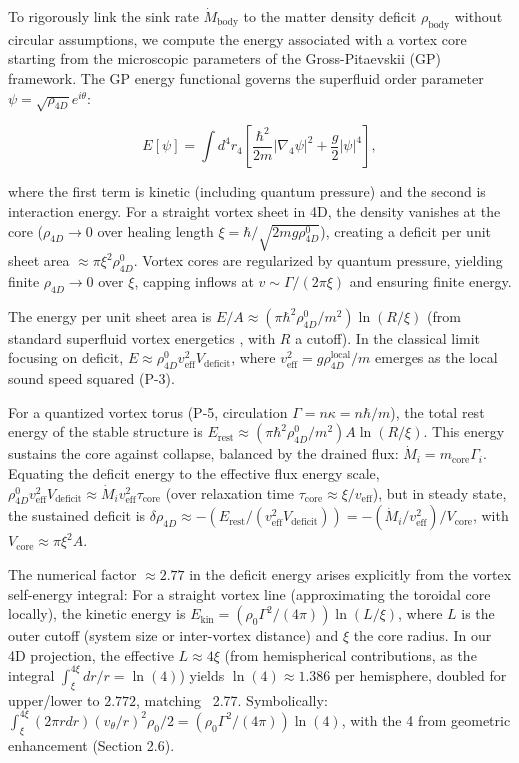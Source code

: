 \documentclass{article}
\begin{document}
To rigorously link the sink rate $\dot{M}_{\text{body}}$ to the matter density deficit $\rho_{\text{body}}$ without circular assumptions, we compute the energy associated with a vortex core starting from the microscopic parameters of the Gross-Pitaevskii (GP) framework. The GP energy functional governs the superfluid order parameter $\psi = \sqrt{\rho_{4D}} e^{i \theta}$:

\[
E[\psi] = \int d^4 r_4 \left[ \frac{\hbar^2}{2 m} |\nabla_4 \psi|^2 + \frac{g}{2} |\psi|^4 \right],
\]

where the first term is kinetic (including quantum pressure) and the second is interaction energy. For a straight vortex sheet in 4D, the density vanishes at the core ($\rho_{4D} \to 0$ over healing length $\xi = \hbar / \sqrt{2 m g \rho_{4D}^0}$), creating a deficit per unit sheet area $\approx \pi \xi^2 \rho_{4D}^0$. Vortex cores are regularized by quantum pressure, yielding finite $\rho_{4D} \to 0$ over $\xi$, capping inflows at $v \sim \Gamma / (2\pi \xi)$ and ensuring finite energy.

The energy per unit sheet area is $E / A \approx (\pi \hbar^2 \rho_{4D}^0 / m^2) \ln(R / \xi)$ (from standard superfluid vortex energetics \cite{onsager1949, feynman1955}, with $R$ a cutoff). In the classical limit focusing on deficit, $E \approx \rho_{4D}^0 v_{\text{eff}}^2 V_{\text{deficit}}$, where $v_{\text{eff}}^2 = g \rho_{4D}^{\text{local}} / m$ emerges as the local sound speed squared (P-3).

For a quantized vortex torus (P-5, circulation $\Gamma = n \kappa = n \hbar / m$), the total rest energy of the stable structure is $E_{\text{rest}} \approx (\pi \hbar^2 \rho_{4D}^0 / m^2) A \ln(R / \xi)$. This energy sustains the core against collapse, balanced by the drained flux: $\dot{M}_i = m_{\text{core}} \Gamma_i$. Equating the deficit energy to the effective flux energy scale, $\rho_{4D}^0 v_{\text{eff}}^2 V_{\text{deficit}} \approx \dot{M}_i v_{\text{eff}}^2 \tau_{\text{core}}$ (over relaxation time $\tau_{\text{core}} \approx \xi / v_{\text{eff}}$), but in steady state, the sustained deficit is $\delta \rho_{4D} \approx - (E_{\text{rest}} / (v_{\text{eff}}^2 V_{\text{deficit}})) = - (\dot{M}_i / v_{\text{eff}}^2) / V_{\text{core}}$, with $V_{\text{core}} \approx \pi \xi^2 A$.

The numerical factor \(\approx 2.77\) in the deficit energy arises explicitly from the vortex self-energy integral: For a straight vortex line (approximating the toroidal core locally), the kinetic energy is \(E_{\text{kin}} = (\rho_0 \Gamma^2 / (4\pi)) \ln(L / \xi)\), where \(L\) is the outer cutoff (system size or inter-vortex distance) and \(\xi\) the core radius. In our 4D projection, the effective \(L \approx 4 \xi\) (from hemispherical contributions, as the integral \(\int_\xi^{4\xi} dr / r = \ln(4)\)) yields \(\ln(4) \approx 1.386\) per hemisphere, doubled for upper/lower to \(2.772\), matching ~2.77. Symbolically: \(\int_{\xi}^{4\xi} (2\pi r dr) (v_\theta / r)^2 \rho_0 / 2 = (\rho_0 \Gamma^2 / (4\pi)) \ln(4)\), with the 4 from geometric enhancement (Section 2.6).
\end{document}
